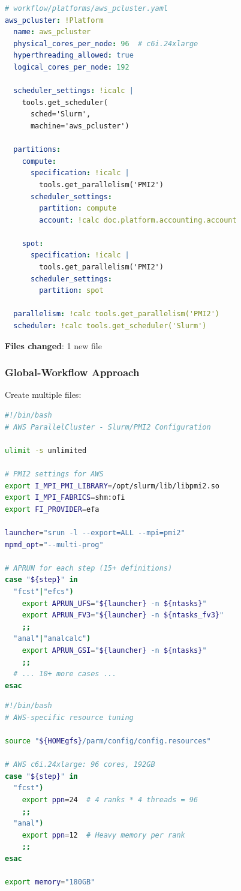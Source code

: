 \documentclass[11pt,twoside]{article}
\newcommand{\crow}{\textsc{CROW}}
\begin{document}
\begin{lstlisting}[language=YAML, caption={New Platform in \crow{}}]
# workflow/platforms/aws_pcluster.yaml
aws_pcluster: !Platform
  name: aws_pcluster
  physical_cores_per_node: 96  # c6i.24xlarge
  hyperthreading_allowed: true
  logical_cores_per_node: 192
  
  scheduler_settings: !icalc |
    tools.get_scheduler(
      sched='Slurm',
      machine='aws_pcluster')
  
  partitions:
    compute:
      specification: !icalc |
        tools.get_parallelism('PMI2')
      scheduler_settings:
        partition: compute
        account: !calc doc.platform.accounting.account
        
    spot:
      specification: !icalc |
        tools.get_parallelism('PMI2')
      scheduler_settings:
        partition: spot
        
  parallelism: !calc tools.get_parallelism('PMI2')
  scheduler: !calc tools.get_scheduler('Slurm')
\end{lstlisting}

\textbf{Files changed}: 1 new file

\subsubsection{Global-Workflow Approach}

Create multiple files:

\begin{lstlisting}[language=Bash, caption={New Platform Environment (\texttt{env/AWS.env})}]
#!/bin/bash
# AWS ParallelCluster - Slurm/PMI2 Configuration

ulimit -s unlimited

# PMI2 settings for AWS
export I_MPI_PMI_LIBRARY=/opt/slurm/lib/libpmi2.so
export I_MPI_FABRICS=shm:ofi
export FI_PROVIDER=efa

launcher="srun -l --export=ALL --mpi=pmi2"
mpmd_opt="--multi-prog"

# APRUN for each step (15+ definitions)
case "${step}" in
  "fcst"|"efcs")
    export APRUN_UFS="${launcher} -n ${ntasks}"
    export APRUN_FV3="${launcher} -n ${ntasks_fv3}"
    ;;
  "anal"|"analcalc")
    export APRUN_GSI="${launcher} -n ${ntasks}"
    ;;
  # ... 10+ more cases ...
esac
\end{lstlisting}

\begin{lstlisting}[language=Bash, caption={Platform Resource Overrides (\texttt{config.resources.AWS})}]
#!/bin/bash
# AWS-specific resource tuning

source "${HOMEgfs}/parm/config/config.resources"

# AWS c6i.24xlarge: 96 cores, 192GB
case "${step}" in
  "fcst")
    export ppn=24  # 4 ranks * 4 threads = 96 
    ;;
  "anal")
    export ppn=12  # Heavy memory per rank
    ;;
esac

export memory="180GB"
\end{lstlisting}
\end{document}
